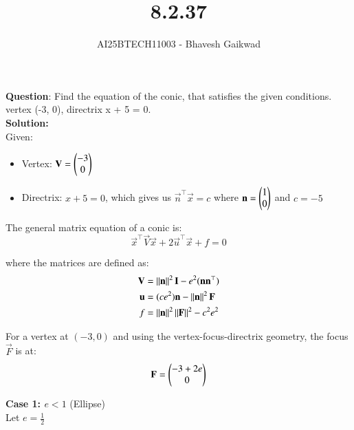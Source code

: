 \documentclass[journal]{IEEEtran}
\begin{document}

\vspace{3cm}

\title{8.2.37}
\author{AI25BTECH11003 - Bhavesh Gaikwad}
{\let\newpage\relax\maketitle}

\renewcommand{\thefigure}{\theenumi}
\renewcommand{\thetable}{\theenumi}
\setlength{\intextsep}{10pt} 


\renewcommand{\thetable}{\theenumi}


\textbf{Question}: Find the equation of the conic, that satisfies the given conditions.\\
vertex (-3, 0), directrix x + 5 = 0.\\

\textbf{Solution:}\\
Given:
\begin{itemize}
\item Vertex: $\mathbf{V} = \begin{pmatrix}-3 \\ 0\end{pmatrix}$
\item Directrix: $x + 5 = 0$, which gives us $\vec{n}^\top\vec{x} = c$ where $\mathbf{n} = \begin{pmatrix}1 \\ 0\end{pmatrix}$ and $c = -5$
\end{itemize}

The general matrix equation of a conic is:
\begin{equation}
\vec{x}^\top\vec{V}\vec{x} + 2\vec{u}^\top\vec{x} + f = 0
\end{equation}

where the matrices are defined as:
\begin{align}
\mathbf{V} &= \left\lVert\mathbf{n}\right\rVert^2\mathbf{I} - e^2(\mathbf{n}\mathbf{n}^\top) \\
\mathbf{u} &= (ce^2)\mathbf{n} - \left\lVert\mathbf{n}\right\rVert^2\mathbf{F} \\
f &= \left\lVert\mathbf{n}\right\rVert^2\left\lVert\mathbf{F}\right\rVert^2 - c^2e^2
\end{align}

For a vertex at $(-3, 0)$ and using the vertex-focus-directrix geometry, the focus $\vec{F}$ is at:
\begin{equation}
\mathbf{F} = \begin{pmatrix}-3 + 2e \\ 0\end{pmatrix}
\end{equation}

\newpage

\textbf{Case 1: $e < 1$} (Ellipse)\\
Let $e = \frac{1}{2}$
\end{document}
